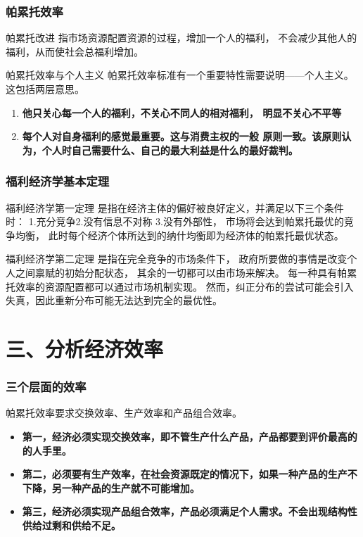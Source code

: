 \documentclass[aspectratio=169, 12pt]{beamer}
\begin{document}
\begin{frame}[plain]
    \frametitle{帕累托效率}
    \begin{block}{帕累托改进}
        指市场资源配置资源的过程，增加一个人的福利，
不会减少其他人的福利，从而使社会总福利增加。
    \end{block}
    \begin{block}{帕累托效率与个人主义}
       帕累托效率标准有一个重要特性需要说明——个人主义。这包括两层意思。
       \begin{enumerate}
        \item \textbf{他只关心每一个人的福利，不关心不同人的相对福利，
        明显不关心不平等}
        \item \textbf{每个人对自身福利的感觉最重要。这与消费主权的一般
        原则一致。该原则认为，个人时自己需要什么、自己的最大利益是什么的最好裁判。}
       \end{enumerate}
    \end{block}
\end{frame}

\begin{frame}[plain]
    \frametitle{福利经济学基本定理}
    \begin{block}{福利经济学第一定理}
        是指在经济主体的偏好被良好定义，并满足以下三个条件时：
        1.充分竞争2.没有信息不对称 3.没有外部性，
        市场将会达到帕累托最优的竞争均衡，
        此时每个经济个体所达到的纳什均衡即为经济体的帕累托最优状态。
    \end{block}
    \begin{block}{福利经济学第二定理}
        是指在完全竞争的市场条件下，
        政府所要做的事情是改变个人之间禀赋的初始分配状态，
        其余的一切都可以由市场来解决。
        每一种具有帕累托效率的资源配置都可以通过市场机制实现。
        然而，纠正分布的尝试可能会引入失真，因此重新分布可能无法达到完全的最优性。
    \end{block}
\end{frame}

\section{三、分析经济效率}

\begin{frame}[plain]
    \frametitle{三个层面的效率}
    帕累托效率要求交换效率、生产效率和产品组合效率。
    \begin{itemize}
        \item \textbf{第一，经济必须实现交换效率，即不管生产什么产品，产品都要到评价最高的的人手里。}
        \item \textbf{第二，必须要有生产效率，在社会资源既定的情况下，如果一种产品的生产不下降，另一种产品的生产就不可能增加。}
        \item \textbf{第三，经济必须实现产品组合效率，产品必须满足个人需求。不会出现结构性供给过剩和供给不足。}
    \end{itemize}
\end{frame}
\end{document}
